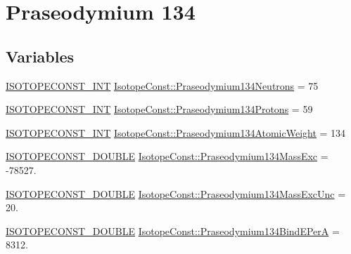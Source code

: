\hypertarget{group___isotope_const-_praseodymium-_pr134}{}\section{Praseodymium 134}
\label{group___isotope_const-_praseodymium-_pr134}
\subsection*{Variables}
\begin{DoxyCompactItemize}
\item 
\mbox{\hyperlink{group___isotope_const-_macros_ga5f18360b3e99483a35c32d789e62621c}{I\+S\+O\+T\+O\+P\+E\+C\+O\+N\+S\+T\+\_\+\+I\+NT}} \mbox{\hyperlink{group___isotope_const-_praseodymium-_pr134_ga1a1efb0244118b294a86cbeec2ff5c27}{Isotope\+Const\+::\+Praseodymium134\+Neutrons}} = 75
\item 
\mbox{\hyperlink{group___isotope_const-_macros_ga5f18360b3e99483a35c32d789e62621c}{I\+S\+O\+T\+O\+P\+E\+C\+O\+N\+S\+T\+\_\+\+I\+NT}} \mbox{\hyperlink{group___isotope_const-_praseodymium-_pr134_ga85603a255a42d75020dbeb1a2229ee1a}{Isotope\+Const\+::\+Praseodymium134\+Protons}} = 59
\item 
\mbox{\hyperlink{group___isotope_const-_macros_ga5f18360b3e99483a35c32d789e62621c}{I\+S\+O\+T\+O\+P\+E\+C\+O\+N\+S\+T\+\_\+\+I\+NT}} \mbox{\hyperlink{group___isotope_const-_praseodymium-_pr134_gad0b3c47fc11ea485da22955c45377c3c}{Isotope\+Const\+::\+Praseodymium134\+Atomic\+Weight}} = 134
\item 
\mbox{\hyperlink{group___isotope_const-_macros_ga8f45a7272ce02c0b4c65c44636ed719a}{I\+S\+O\+T\+O\+P\+E\+C\+O\+N\+S\+T\+\_\+\+D\+O\+U\+B\+LE}} \mbox{\hyperlink{group___isotope_const-_praseodymium-_pr134_ga0c90fce95fb83428fb16effeb253e025}{Isotope\+Const\+::\+Praseodymium134\+Mass\+Exc}} = -\/78527.
\item 
\mbox{\hyperlink{group___isotope_const-_macros_ga8f45a7272ce02c0b4c65c44636ed719a}{I\+S\+O\+T\+O\+P\+E\+C\+O\+N\+S\+T\+\_\+\+D\+O\+U\+B\+LE}} \mbox{\hyperlink{group___isotope_const-_praseodymium-_pr134_gaaa0884f0398e8cd4cfffa3d1d53a1ef6}{Isotope\+Const\+::\+Praseodymium134\+Mass\+Exc\+Unc}} = 20.
\item 
\mbox{\hyperlink{group___isotope_const-_macros_ga8f45a7272ce02c0b4c65c44636ed719a}{I\+S\+O\+T\+O\+P\+E\+C\+O\+N\+S\+T\+\_\+\+D\+O\+U\+B\+LE}} \mbox{\hyperlink{group___isotope_const-_praseodymium-_pr134_gaf194bfcaf49699f3533844b66d8f05b5}{Isotope\+Const\+::\+Praseodymium134\+Bind\+E\+PerA}} = 8312.

\end{DoxyCompactItemize}
